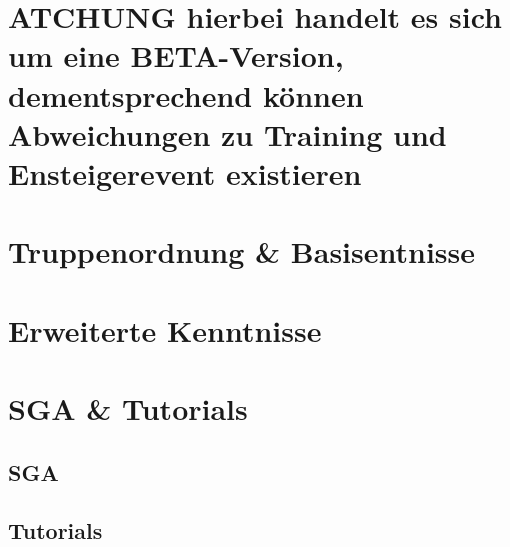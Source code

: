 \documentclass[pdftex,fontsize=12pt,a4paper,numbers=noenddot]{scrreprt}
\begin{document}


\newpage
{} %

\tableofcontents %

\newpage
{} %
\pagestyle{scrheadings}
\renewcommand{\chapterpagestyle}{scrheadings}


\part*{ATCHUNG hierbei handelt es sich um eine BETA-Version, dementsprechend können Abweichungen zu Training und Ensteigerevent existieren}
\part{Truppenordnung \& Basisentnisse}




\part{Erweiterte Kenntnisse}


\part{SGA \& Tutorials}
\chapter{SGA}
%
\chapter{Tutorials}
%

%




\cleardoublepage
\appendix
\end{document}
